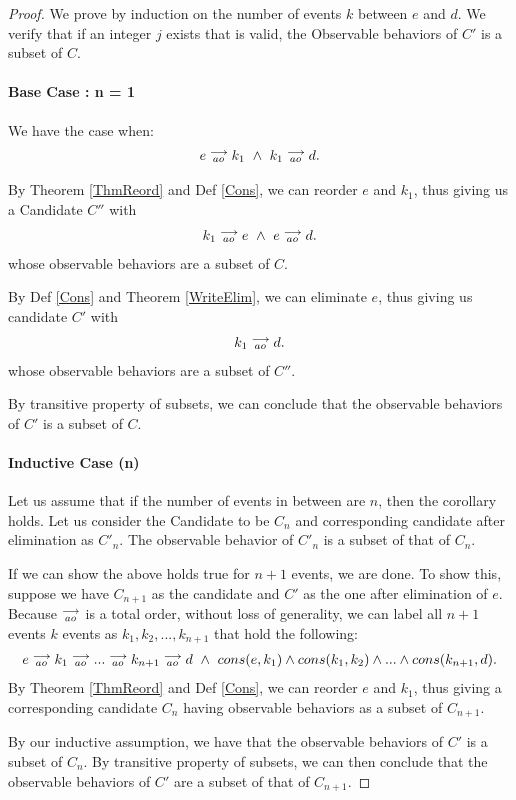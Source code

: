 \begin{proof}
    We prove by induction on the number of events $k$ between $e$ and $d$.
    We verify that if an integer $j$ exists that is valid, the Observable behaviors of $C'$ is a subset of $C$.

    \paragraph{Base Case : n = 1}

        We have the case when:
        \begin{align*}
            e\stackrel{\longrightarrow}{_{ao}}k_1 \ \wedge \ k_1\stackrel{\longrightarrow}{_{ao}}d.
        \end{align*}

        By Theorem \ref{ThmReord} and Def \ref{Cons}, we can reorder $e$ and $k_1$, thus giving us a Candidate $C''$ with 
        \begin{align*}
            k_1\stackrel{\longrightarrow}{_{ao}}e \ \wedge \ e\stackrel{\longrightarrow}{_{ao}}d.
        \end{align*}  
        whose observable behaviors are a subset of $C$.

        By Def \ref{Cons} and Theorem \ref{WriteElim}, we can eliminate $e$, thus giving us candidate $C'$  with  
        \begin{align*}
            k_1\stackrel{\longrightarrow}{_{ao}}d.
        \end{align*} 
        whose observable behaviors are a subset of $C''$.

        By transitive property of subsets, we can conclude that the observable behaviors of $C'$ is a subset of $C$. 
    \paragraph{Inductive Case (n)}

        Let us assume that if the number of events in between are $n$, then the corollary holds. 
        Let us consider the Candidate to be $C_n$ and corresponding candidate after elimination as $C'_n$. 
        The observable behavior of $C'_n$ is a subset of that of $C_n$.

        If we can show the above holds true for $n+1$ events, we are done.
        To show this, suppose we have $C_{n+1}$ as the candidate and $C'$ as the one after elimination of $e$. 
        Because $\stackrel{\longrightarrow}{_{ao}}$ is a total order, without loss of generality, we can label all $n+1$ events $k$ events as  $k_1, k_2 , ... , k_{n+1}$ that hold the following:
        \begin{align*}
            \reln{e}{ao}{\reln{k_1}{ao}{\reln{...}{ao}{\reln{k_{n+1}}{ao}{d}}}} 
            \ \wedge \ 
            cons(e,k_1) \wedge cons(k_1, k_2) \wedge ... \wedge cons(k_{n+1}, d). 
        \end{align*}
        By Theorem \ref{ThmReord} and Def \ref{Cons}, we can reorder $e$ and $k_1$, thus giving a corresponding candidate $C_n$ having observable behaviors as a subset of $C_{n+1}$. 

        By our inductive assumption, we have that the observable behaviors of $C'$ is a subset of $C_n$. 
        By transitive property of subsets, we can then conclude that the observable behaviors of $C'$ are a subset of that of $C_{n+1}$.

\end{proof}
